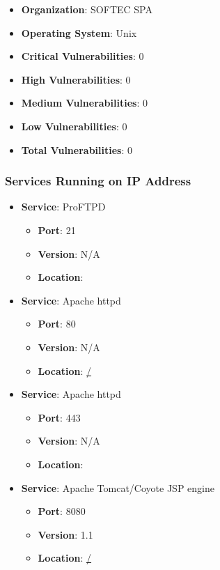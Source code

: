 \documentclass{article}
\begin{document}
\begin{itemize}
    \item \textbf{Organization}: SOFTEC SPA
    \item \textbf{Operating System}:  Unix 
    \item \textbf{Critical Vulnerabilities}: 0
    \item \textbf{High Vulnerabilities}: 0
    \item \textbf{Medium Vulnerabilities}: 0
    \item \textbf{Low Vulnerabilities}: 0
    \item \textbf{Total Vulnerabilities}: 0
\end{itemize}

\subsubsection*{Services Running on IP Address}

\begin{itemize}
    
        \item \textbf{Service}: ProFTPD
        \begin{itemize}
            \item \textbf{Port}: 21
            \item \textbf{Version}:  N/A 
            \item \textbf{Location}: \href{  }{  }
        \end{itemize}
    
        \item \textbf{Service}: Apache httpd
        \begin{itemize}
            \item \textbf{Port}: 80
            \item \textbf{Version}:  N/A 
            \item \textbf{Location}: \href{ / }{ / }
        \end{itemize}
    
        \item \textbf{Service}: Apache httpd
        \begin{itemize}
            \item \textbf{Port}: 443
            \item \textbf{Version}:  N/A 
            \item \textbf{Location}: \href{  }{  }
        \end{itemize}
    
        \item \textbf{Service}: Apache Tomcat/Coyote JSP engine
        \begin{itemize}
            \item \textbf{Port}: 8080
            \item \textbf{Version}:  1.1 
            \item \textbf{Location}: \href{ / }{ / }
        \end{itemize}
    
\end{itemize}
\end{document}
